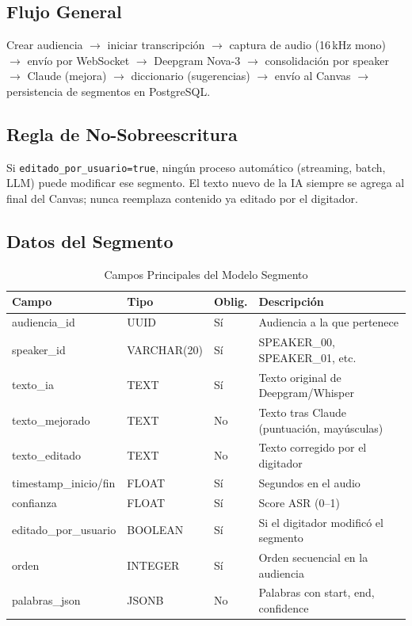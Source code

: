 \documentclass[12pt,a4paper]{report}
\begin{document}
\subsection{Flujo General}

Crear audiencia $\to$ iniciar transcripción $\to$ captura de audio (16\,kHz mono) $\to$ envío por WebSocket $\to$ Deepgram Nova-3 $\to$ consolidación por speaker $\to$ Claude (mejora) $\to$ diccionario (sugerencias) $\to$ envío al Canvas $\to$ persistencia de segmentos en PostgreSQL.

\subsection{Regla de No-Sobreescritura}

Si \texttt{editado\_por\_usuario=true}, ningún proceso automático (streaming, batch, LLM) puede modificar ese segmento. El texto nuevo de la IA siempre se agrega al final del Canvas; nunca reemplaza contenido ya editado por el digitador.

\subsection{Datos del Segmento}

\begin{table}[H]
\centering
\small
\begin{tabular}{|p{3.2cm}|p{2.2cm}|p{1.8cm}|p{5cm}|}
\hline
\rowcolor{primaryblue!20}
\textbf{Campo} & \textbf{Tipo} & \textbf{Oblig.} & \textbf{Descripción} \\
\hline
audiencia\_id & UUID & Sí & Audiencia a la que pertenece \\
\hline
speaker\_id & VARCHAR(20) & Sí & SPEAKER\_00, SPEAKER\_01, etc. \\
\hline
texto\_ia & TEXT & Sí & Texto original de Deepgram/Whisper \\
\hline
texto\_mejorado & TEXT & No & Texto tras Claude (puntuación, mayúsculas) \\
\hline
texto\_editado & TEXT & No & Texto corregido por el digitador \\
\hline
timestamp\_inicio/fin & FLOAT & Sí & Segundos en el audio \\
\hline
confianza & FLOAT & Sí & Score ASR (0--1) \\
\hline
editado\_por\_usuario & BOOLEAN & Sí & Si el digitador modificó el segmento \\
\hline
orden & INTEGER & Sí & Orden secuencial en la audiencia \\
\hline
palabras\_json & JSONB & No & Palabras con start, end, confidence \\
\hline
\end{tabular}
\caption{Campos Principales del Modelo Segmento}
\end{table}
\end{document}
